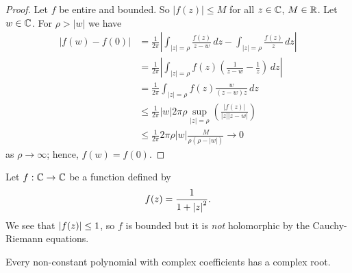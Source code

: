 \begin{proof}
    Let $f$ be entire and bounded.
    So $\lvert f(z) \rvert \leq M$ for all $z \in \mathbb{C}$, $M \in \mathbb{R}$.
    Let $w \in \mathbb{C}$.
    For $\rho > \lvert w \rvert$ we have
    \begin{align*}
        \lvert f(w) - f(0) \rvert
        &=
        \frac{1}{2\pi} 
        \left\lvert
            \int_{\lvert z \rvert = \rho} \frac{f(z)}{z-w} \,dz - \int_{\lvert z \rvert = \rho} \frac{f(z)}{z} \,dz
        \right\rvert
        \tag{CIF} \\
        &= \frac{1}{2\pi}
        \left\lvert
            \int_{\lvert z \rvert = \rho} f(z)
            \left(
                \frac{1}{z - w} - \frac 1z
            \right)
            \,dz
        \right\rvert
        \\
        &= \frac{1}{2\pi} \int_{\lvert z \rvert = \rho} f(z) \frac{w}{(z - w)z} \,dz \\
        &\leq \frac{1}{2\pi} \lvert w \rvert 2 \pi \rho \sup_{\lvert z \rvert = \rho}
        \left(
            \frac{\lvert f(z) \rvert}{\lvert z \rvert \lvert z - w \rvert} 
        \right) \\
        &\leq \frac{1}{2\pi} 2 \pi \rho \lvert w \rvert \frac{M}{\rho(\rho - \lvert w \rvert)}  \to 0
    \end{align*}
    as $\rho \to \infty$;
    hence, $f(w) = f(0)$.
\end{proof}


\begin{example}
    Let $f: \mathbb{C} \to \mathbb{C}$ be a function defined by
    \[
        f(z) = \frac{1}{1 + \left\lvert z\right\rvert^2}.
    \]
    We see that $\left\lvert f(z)\right\rvert \leq 1$, 
    so $f$ is bounded but it is \emph{not} holomorphic by the Cauchy-Riemann equations.
\end{example}

\begin{theorem}
    Every non-constant polynomial with complex coefficients has a complex root.
\end{theorem}

